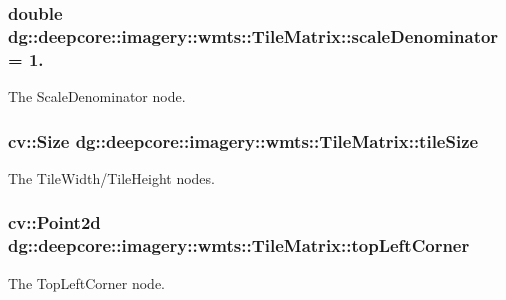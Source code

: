 \subsubsection[{\texorpdfstring{scale\+Denominator}{scaleDenominator}}]{\setlength{\rightskip}{0pt plus 5cm}double dg\+::deepcore\+::imagery\+::wmts\+::\+Tile\+Matrix\+::scale\+Denominator = 1.}\hypertarget{structdg_1_1deepcore_1_1imagery_1_1wmts_1_1_tile_matrix_a111edc4eea402d1a9e40f60f0d673ece}{}\label{structdg_1_1deepcore_1_1imagery_1_1wmts_1_1_tile_matrix_a111edc4eea402d1a9e40f60f0d673ece}


The Scale\+Denominator node. 

\subsubsection[{\texorpdfstring{tile\+Size}{tileSize}}]{\setlength{\rightskip}{0pt plus 5cm}cv\+::\+Size dg\+::deepcore\+::imagery\+::wmts\+::\+Tile\+Matrix\+::tile\+Size}\hypertarget{structdg_1_1deepcore_1_1imagery_1_1wmts_1_1_tile_matrix_ace8dcd0a02171503108255096eac224f}{}\label{structdg_1_1deepcore_1_1imagery_1_1wmts_1_1_tile_matrix_ace8dcd0a02171503108255096eac224f}


The Tile\+Width/\+Tile\+Height nodes. 

\subsubsection[{\texorpdfstring{top\+Left\+Corner}{topLeftCorner}}]{\setlength{\rightskip}{0pt plus 5cm}cv\+::\+Point2d dg\+::deepcore\+::imagery\+::wmts\+::\+Tile\+Matrix\+::top\+Left\+Corner}\hypertarget{structdg_1_1deepcore_1_1imagery_1_1wmts_1_1_tile_matrix_ac821a1a8a6db19c1a91f564b99fcc33f}{}\label{structdg_1_1deepcore_1_1imagery_1_1wmts_1_1_tile_matrix_ac821a1a8a6db19c1a91f564b99fcc33f}


The Top\+Left\+Corner node. 

